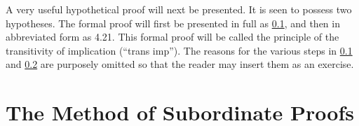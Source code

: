 \documentclass{book}
\begin{document}
A very useful hypothetical proof will next be presented.  It is seen to possess two hypotheses.  The formal proof will first be presented in full as \ref{sec:4.20}, and then in abbreviated form as 4.21.  This formal proof will be called the principle of the transitivity of implication (“trans imp”).  The reasons for the various steps in \ref{sec:4.20} and \ref{sec:4.21} are purposely omitted so that the reader may insert them as an exercise.

\smallskip
\subsection{}
\label{sec:4.20}

\smallskip
\subsection{}
\label{sec:4.21}


\chapter{The Method of Subordinate Proofs}
\label{chap:2}
\end{document}
